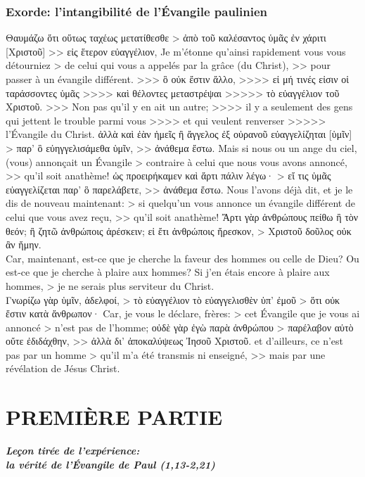 \documentclass[14pt,a4paper,twoside]{extarticle}
\newcommand{\commentaire}[1]{\par\vspace{-0.8em}%
  {\centering\large\bfseries\itshape #1\par}\vspace{0.6em}}
\begin{document}
\begin{paracol}[1]
  \subsubsection*{Exorde: l'intangibilité de l'Évangile paulinien}
  \verset
  {Θαυμάζω ὅτι οὕτως ταχέως μετατίθεσθε
    > ἀπὸ τοῦ καλέσαντος ὑμᾶς ἐν χάριτι [Χριστοῦ]
    >> εἰς ἕτερον εὐαγγέλιον,}
  {Je m'étonne qu'ainsi rapidement vous vous détourniez
    > de celui qui vous a appelés par la grâce (du Christ),
    >> pour passer à un évangile différent.}
  \verset
  {>>> ὃ οὐκ ἔστιν ἄλλο,
    >>>> εἰ μή τινές εἰσιν οἱ ταράσσοντες ὑμᾶς
    >>>> καὶ θέλοντες μεταστρέψαι
    >>>>> τὸ εὐαγγέλιον τοῦ Χριστοῦ.}
  {>>> Non pas qu’il y en ait un autre;
    >>>> il y a seulement des gens qui jettent le trouble parmi vous
    >>>> et qui veulent renverser
    >>>>> l’Évangile du Christ.}
  \verset
  {ἀλλὰ καὶ ἐὰν ἡμεῖς ἢ ἄγγελος ἐξ οὐρανοῦ
    εὐαγγελίζηται [ὑμῖν]
    > παρ’ ὃ εὐηγγελισάμεθα ὑμῖν,
    >> ἀνάθεμα ἔστω.}
  {Mais si nous ou un ange du ciel,
    (vous) annonçait un Évangile
    > contraire à celui que nous vous avons annoncé,
    >> qu’il soit anathème!}
  \verset
  {ὡς προειρήκαμεν καὶ ἄρτι πάλιν λέγω·
    > εἴ τις ὑμᾶς εὐαγγελίζεται παρ’ ὃ παρελάβετε,
    >> ἀνάθεμα ἔστω.}
  {Nous l’avons déjà dit, et je le dis de nouveau maintenant:
    > si quelqu’un vous annonce un évangile différent de celui que vous avez reçu,
    >> qu’il soit anathème!}
  \verset
  {Ἄρτι γὰρ ἀνθρώπους πείθω ἢ τὸν θεόν;
    ἢ ζητῶ ἀνθρώποις ἀρέσκειν;
    εἰ ἔτι ἀνθρώποις ἤρεσκον,
    > Χριστοῦ δοῦλος οὐκ ἂν ἤμην. \\}
  {Car, maintenant, est-ce que je cherche la faveur des hommes ou celle de Dieu?
    Ou est-ce que je cherche à plaire aux hommes?
    Si j’en étais encore à plaire aux hommes,
    > je ne serais plus serviteur du Christ. \\}
  \verset
  {Γνωρίζω γὰρ ὑμῖν, ἀδελφοί,
    > τὸ εὐαγγέλιον τὸ εὐαγγελισθὲν ὑπ’ ἐμοῦ
    > ὅτι οὐκ ἔστιν κατὰ ἄνθρωπον·}
  {Car, je vous le déclare, frères:
    > cet Évangile que je vous ai annoncé
    > n’est pas de l’homme;}
  \verset
  {οὐδὲ γὰρ ἐγὼ παρὰ ἀνθρώπου
    > παρέλαβον αὐτὸ οὔτε ἐδιδάχθην,
    >> ἀλλὰ δι’ ἀποκαλύψεως Ἰησοῦ Χριστοῦ.}
  {et d’ailleurs, ce n’est pas par un homme
    > qu’il m’a été transmis ni enseigné,
    >> mais par une révélation de Jésus Christ.}


  \section*{PREMIÈRE PARTIE}
  \commentaire{Leçon tirée de l'expérience:\\la vérité de l'Évangile de Paul (1,13-2,21)}

\end{paracol}
\end{document}
